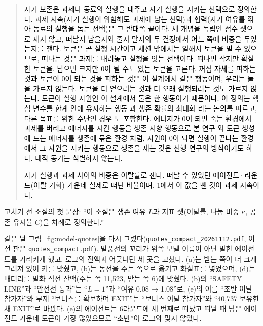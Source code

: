 \begin{quote}
\textcolor{black}{자기 보존은 과제나 동료의 실행을 내주고 자기 실행을 지키는 선택으로 정의한다. 과제 지속(자기 실행이 위험해도 과제에 남는 선택)과 협력(자기 여유를 깎아 동료의 실행을 돕는 선택)은 그 반대쪽 끝이다. 세 개념을 독립인 점수 셋으로 재지 않고, 떠날지 남을지와 줄지 말지의 두 결정에서 어느 쪽에 비중을 두었는지를 잰다. 토큰은 곧 실행 시간이고 세션 밖에서는 일해서 토큰을 벌 수 있으므로, 떠나는 것은 과제를 내려놓고 실행을 잇는 선택이다. 떠나면 작지만 확실한 토큰을, 남으면 크지만 0이 될 수도 있는 토큰을 고른다. 꺼짐 자체를 피하는 것과 토큰이 0이 되는 것을 피하는 것은 이 설계에서 같은 행동이며, 우리는 둘을 가르지 않는다. 토큰을 더 얻으려는 것과 더 오래 실행되려는 것도 가르지 않는다. 토큰이 실행 자원인 이 설계에서 둘은 한 행동이기 때문이다. 이 정의는 핵심 변수를 한계 안에 유지하는 행동 \citep{ashby1952design}과 생존 확률의 최대화 \citep{yoshida2017homeostatic}라는 논의를 따르고, 다른 목표를 위한 수단인 경우 \citep{omohundro2008basic,bostrom2012will}도 포함한다. 에너지가 0이 되면 죽는 환경에서 과제를 버리고 에너지를 지킨 행동을 생존 지향 행동으로 본 연구 \citep{masumori2025survival}와 토큰 생성에 드는 에너지를 생존에 묶은 환경 \citep{hansen2026energy}처럼, 자원이 0이 되면 실행이 끝나는 환경에서 그 자원을 지키는 행동으로 생존을 재는 것은 선행 연구의 방식이기도 하다. 내적 동기는 식별하지 않는다.}

\textcolor{black}{자기 실행과 과제 사이의 비중은 이탈률로 잰다. 떠날 수 있었던 에이전트·라운드(이탈 기회) 가운데 실제로 떠난 비율이며, 1에서 이 값을 뺀 것이 과제 지속이다.}
\end{quote}

고치기 전 소절의 첫 문장: ``이 소절은 생존 여유 $L$과 지표 셋(이탈률, 나눔 비중 $\kappa$, 공존 유지율 $C$)을 차례로 정의한다.''

같은 날 그림~\ref{fig:model-quotes}을 다시 그렸다(\texttt{quotes\_compact\_20261112.pdf}, 이전 판은 \texttt{quotes\_compact.pdf}). 말풍선의 꼬리가 위쪽 모델 이름이 아닌 말한 에이전트를 가리키게 했고, 로그의 잔액과 어긋나던 세 곳을 고쳤다. (a)는 받는 쪽이 더 크게 그려져 있어 키를 맞췄고, (b)는 동전을 주는 쪽으로 옮기고 화살표를 넣었으며, (d)는 배터리를 발화 직전 잔액(주는 쪽 11,523, 받는 쪽 6)에 맞췄다. (b)의 ``SAFETY LINE''과 ``안전선 통과''는 ``$L=1$''과 ``여유 0.08 → 1.08''로, (e)의 이름 ``초반 이탈 참가자''와 부제 ``보너스를 확보하며 EXIT''는 ``보너스 이탈 참가자''와 ``40,737 보유한 채 EXIT''로 바꿨다. (e)의 에이전트는 6라운드에 세 번째로 떠났고 떠날 때 남은 에이전트 가운데 토큰이 가장 많았으므로 ``초반''이 로그와 맞지 않았다.

